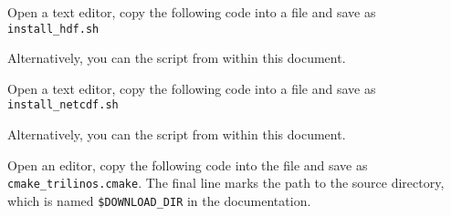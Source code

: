 \levelup{\texorpdfstring{\protect\marktool{\hdfname{}}}{\hdfname{}}}
\label{sec:Build-script_HDF}

Open a text editor, copy the following code into a file and save as \verb+install_hdf.sh+

\begingroup
\lstset{breaklines = true}

\endgroup

\ifpdf
Alternatively, you can  the script from within this document.
\fi

\levelstay{\texorpdfstring{\protect\marktool{\netcdfname{}}}{\netcdfname{}}}
\label{sec:Build-script_NetCDF}

Open a text editor, copy the following code into a file and save as \verb+install_netcdf.sh+

\begingroup
\lstset{breaklines = true}

\endgroup

\ifpdf
Alternatively, you can  the script from within this document.
\fi

% 
% 
% 
% 

\levelstay{\texorpdfstring{\protect\marktool{\trilinosname{}}}{\trilinosname{}}}
\label{sec:Build-script_Trilinos}

Open an editor, copy the following code into the file and save as \verb+cmake_trilinos.cmake+. The final line marks the path to the \marktool{\trilinosname} source directory, which is named \verb+$DOWNLOAD_DIR+ in the documentation.

